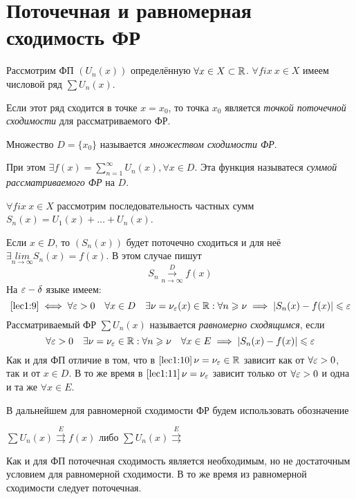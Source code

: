 \documentclass[../../main.tex]{subfiles}
\begin{document}
\section{Поточечная и равномерная сходимость ФР}
Рассмотрим ФП $(U_n(x))$ определённую $\forall x \in X \subset \mathbb{R}$. 
$\forall fix \ x \in X$ имеем числовой ряд $\sum U_n(x)$. 

Если этот ряд сходится в точке $x = x_0$, то точка $x_0$ является 
\emph{точкой поточечной сходимости} для рассматриваемого ФР. 

Множество $D = \{x_0\}$ называется \emph{множеством сходимости ФР}.

При этом $\exists f(x) = \sum\limits_{n=1}^{\infty} U_n(x), \forall x \in D$.
Эта функция называтеся \emph{суммой рассматриваемого ФР} на $D$.

$\forall fix \ x \in X$ рассмотрим последовательность частных сумм 
$S_n(x) = U_1(x) + \ldots + U_n(x)$. 	

Если $x \in D$, то $(S_n(x))$ будет поточечно сходиться и для неё 
$\exists \underset{n \to \infty}{lim} S_n(x) = f(x)$. В этом случае
пишут 
\begin{equation}
\label{lec1:9}
S_n \overset{D}{\underset{n \to \infty}\longrightarrow} f(x)
\end{equation}
На $\varepsilon-\delta$ языке имеем:
\begin{equation}
\label{lec1:10}
\eqref{lec1:9} \iff \forall \varepsilon > 0\quad
\forall x \in D \quad \exists \nu = \nu_\varepsilon(x) \in \mathbb{R} :
\forall n \geqslant \nu \implies |S_n(x) - f(x)| \leqslant \varepsilon 
\end{equation}
Рассматриваемый ФР $\sum U_n(x)$ называется \emph{равномерно сходящимся},
если  
\begin{equation}
\label{lec1:11}
\forall \varepsilon > 0 \quad \exists \nu = \nu_\varepsilon \in \mathbb{R} :
\forall n \geqslant \nu \quad \forall x \in E \implies 
|S_n(x) - f(x)| \leqslant \varepsilon
\end{equation}
Как и для ФП отличие в том, что в $\eqref{lec1:10}\, \nu = \nu_\varepsilon \in \mathbb{R}$ 
зависит как от $\forall \varepsilon > 0$, так и от $x \in D$. В то же время в 
$\eqref{lec1:11}\, \nu = \nu_\varepsilon$ зависит только от $\forall \varepsilon > 0$ и 
одна и та же $\forall x \in E$.  

В дальнейшем для равномерной сходимости ФР будем использовать обозначение
 
$\sum U_n(x) \overset{E}{\rightrightarrows} f(x)$ либо 
$\sum U_n(x) \overset{E}{\rightrightarrows}$

Как и для ФП поточечная сходимость является необходимым, 
но не достаточным условием для равномерной сходимости. В то же время
из равномерной сходимости следует поточечная.
\end{document}
